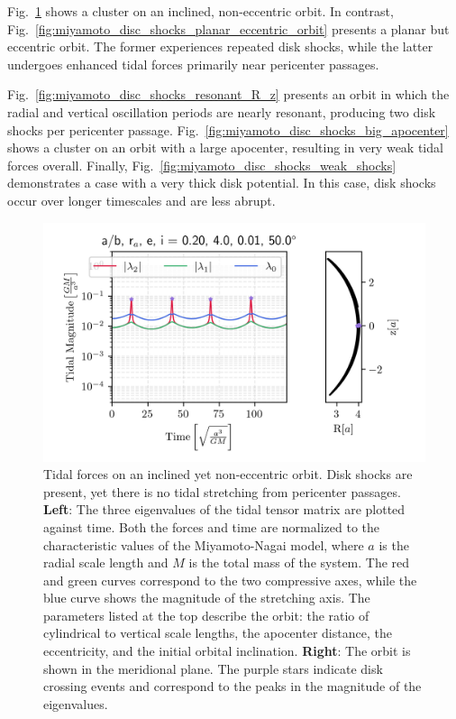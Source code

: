             Fig.~\ref{fig:miyamoto_disc_shocks_circular_inclined_orbit} shows a cluster on an inclined, non-eccentric orbit. In contrast, Fig.~\ref{fig:miyamoto_disc_shocks_planar_eccentric_orbit} presents a planar but eccentric orbit. The former experiences repeated disk shocks, while the latter undergoes enhanced tidal forces primarily near pericenter passages.

            Fig.~\ref{fig:miyamoto_disc_shocks_resonant_R_z} presents an orbit in which the radial and vertical oscillation periods are nearly resonant, producing two disk shocks per pericenter passage. Fig.~\ref{fig:miyamoto_disc_shocks_big_apocenter} shows a cluster on an orbit with a large apocenter, resulting in very weak tidal forces overall. Finally, Fig.~\ref{fig:miyamoto_disc_shocks_weak_shocks} demonstrates a case with a very thick disk potential. In this case, disk shocks occur over longer timescales and are less abrupt.
            \begin{figure}
                \centering
                \includegraphics[width=.9\linewidth]{images/miyamoto_disc_shocks_ab_rp_e_i_0.20_4.0_0.01_50.0.png}
                \caption{Tidal forces on an inclined yet non-eccentric orbit. Disk shocks are present, yet there is no tidal stretching from pericenter passages. \textbf{Left}: The three eigenvalues of the tidal tensor matrix are plotted against time. Both the forces and time are normalized to the characteristic values of the Miyamoto-Nagai model, where $a$ is the radial scale length and $M$ is the total mass of the system. The red and green curves correspond to the two compressive axes, while the blue curve shows the magnitude of the stretching axis. The parameters listed at the top describe the orbit: the ratio of cylindrical to vertical scale lengths, the apocenter distance, the eccentricity, and the initial orbital inclination. \textbf{Right}: The orbit is shown in the meridional plane. The purple stars indicate disk crossing events and correspond to the peaks in the magnitude of the eigenvalues. }
                \label{fig:miyamoto_disc_shocks_circular_inclined_orbit}
            \end{figure}

